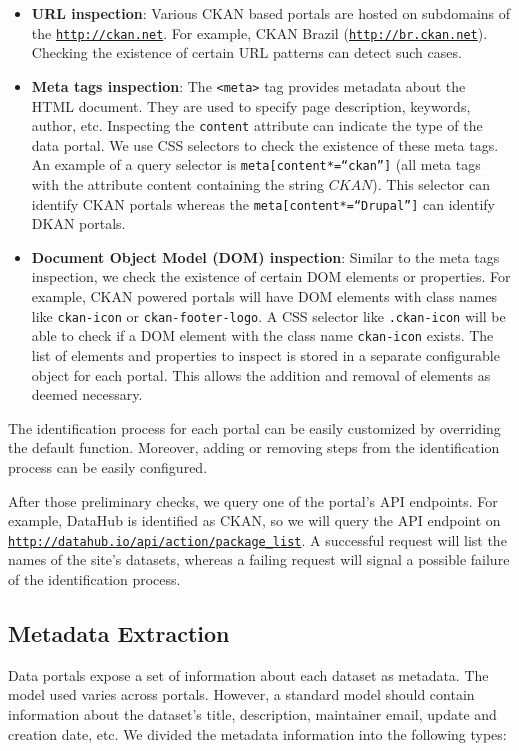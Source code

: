 \documentclass[runningheads,a4paper]{llncs}
\begin{document}
\begin{itemize}
  \item \textbf{URL inspection}: Various CKAN based portals are hosted on subdomains of the \texttt{\url{http://ckan.net}}. For example, CKAN Brazil (\texttt{\url{http://br.ckan.net}}). Checking the existence of certain URL patterns can detect such cases.
  \item \textbf{Meta tags inspection}: The \texttt{<meta>} tag provides metadata about the HTML document. They are used to specify page description, keywords, author, etc. Inspecting the \texttt{content} attribute can indicate the type of the data portal. We use CSS selectors to check the existence of these meta tags. An example of a query selector is \texttt{meta[content*=``ckan'']} (all meta tags with the attribute content containing the string $CKAN$). This selector can identify CKAN portals whereas the \texttt{meta[content*=``Drupal'']} can identify DKAN portals.
  \item \textbf{Document Object Model (DOM) inspection}: Similar to the meta tags inspection, we check the existence of certain DOM elements or properties. For example, CKAN powered portals will have DOM elements with class names like \texttt{ckan-icon} or \texttt{ckan-footer-logo}. A CSS selector like \texttt{.ckan-icon} will be able to check if a DOM element with the class name \texttt{ckan-icon} exists.
  The list of elements and properties to inspect is stored in a separate configurable object for each portal. This allows the addition and removal of elements as deemed necessary.
\end{itemize}

The identification process for each portal can be easily customized by overriding the default function. Moreover, adding or removing steps from the identification process can be easily configured.

After those preliminary checks, we query one of the portal's API endpoints. For example, DataHub is identified as CKAN, so we will query the API endpoint on \texttt{\url{http://datahub.io/api/action/package\_list}}. A successful request will list the names of the site's datasets, whereas a failing request will signal a possible failure of the identification process.

\subsection{Metadata Extraction}

Data portals expose a set of information about each dataset as metadata. The model used varies across portals. However, a standard model should contain information about the dataset's title, description, maintainer email, update and creation date, etc. We divided the metadata information into the following types:
\end{document}

